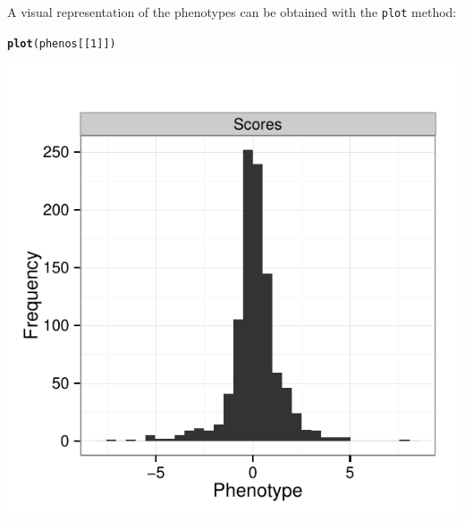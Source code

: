 \documentclass{article}\usepackage[]{graphicx}\usepackage[]{color}
\makeatletter
\newcommand{\hlnum}[1]{\textcolor[rgb]{0.686,0.059,0.569}{#1}}%
\newcommand{\hlstd}[1]{\textcolor[rgb]{0.345,0.345,0.345}{#1}}%
\newcommand{\hlkwd}[1]{\textcolor[rgb]{0.737,0.353,0.396}{\textbf{#1}}}%
\newenvironment{kframe}{%
 \def\at@end@of@kframe{}%
 \ifinner\ifhmode%
  \def\at@end@of@kframe{\end{minipage}}%
  \begin{minipage}{\columnwidth}%
 \fi\fi%
 \def\FrameCommand##1{\hskip\@totalleftmargin \hskip-\fboxsep
 \colorbox{shadecolor}{##1}\hskip-\fboxsep
     \hskip-\linewidth \hskip-\@totalleftmargin \hskip\columnwidth}%
 \MakeFramed {\advance\hsize-\width
   \@totalleftmargin\z@ \linewidth\hsize
   \@setminipage}}%
 {\par\unskip\endMakeFramed%
 \at@end@of@kframe}
\newenvironment{knitrout}{}{} %
\makeatother
\begin{document}
A visual representation of the phenotypes can be obtained with the \texttt{plot} method:
\begin{knitrout}
\color{fgcolor}\begin{kframe}
\begin{alltt}
  \hlkwd{plot}\hlstd{(phenos[[}\hlnum{1}\hlstd{]])}
\end{alltt}


{\ttfamily\noindent\itshape\color{messagecolor}{\#\# stat\_bin: binwidth defaulted to range/30. Use 'binwidth = x' to adjust this.}}\end{kframe}

{\centering \includegraphics[width=.75\textwidth]{tmp/gespeR-plot_phenotypes-1} 

}



\end{knitrout}
\end{document}
